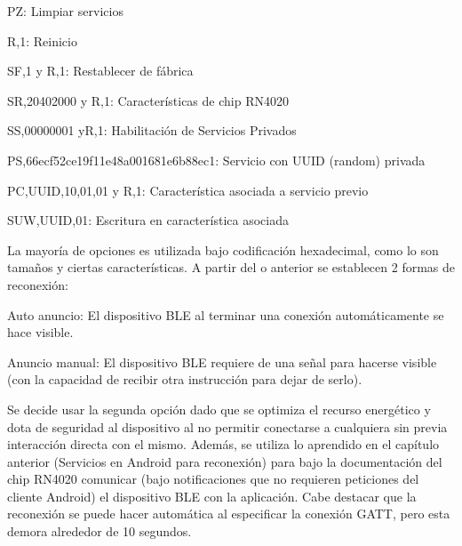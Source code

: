 	PZ: Limpiar servicios
	
	R,1: Reinicio

	SF,1 y R,1: Restablecer de fábrica

	SR,20402000 y R,1: Características de chip RN4020

	SS,00000001 yR,1: Habilitación de Servicios Privados

	PS,66ecf52ce19f11e48a001681e6b88ec1: Servicio con UUID (random) privada

	PC,UUID,10,01,01 y R,1: Característica asociada a servicio previo

	SUW,UUID,01: Escritura en característica asociada

La mayoría de opciones es utilizada bajo codificación hexadecimal, como lo son tamaños y ciertas características. A partir del o anterior se establecen 2 formas de reconexión: 

	Auto anuncio: El dispositivo BLE al terminar una conexión automáticamente se hace visible.

	Anuncio manual: El dispositivo BLE requiere de una señal para hacerse visible (con la capacidad de recibir otra instrucción para dejar de serlo).

Se decide usar la segunda opción dado que se optimiza el recurso energético y dota de seguridad al dispositivo al no permitir conectarse a cualquiera sin previa interacción directa con el mismo. Además, se utiliza lo aprendido en el capítulo anterior (Servicios en Android para reconexión) para bajo la documentación del chip RN4020 comunicar (bajo notificaciones que no requieren peticiones del cliente Android) el dispositivo BLE con la aplicación. Cabe destacar que la reconexión se puede hacer automática al especificar la conexión GATT, pero esta demora alrededor de 10 segundos.
